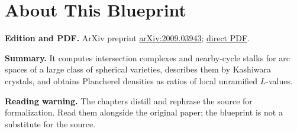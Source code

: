 

\chapter*{About This Blueprint}
\label{intersection-complexes-unramified-l-factors-about}


\textbf{Edition and PDF.} ArXiv preprint \href{https://arxiv.org/abs/2009.03943}{arXiv:2009.03943}; \href{https://arxiv.org/pdf/2009.03943}{direct PDF}.

\textbf{Summary.} It computes intersection complexes and nearby-cycle stalks for arc spaces of a large class of spherical varieties, describes them by Kashiwara crystals, and obtains Plancherel densities as ratios of local unramified $L$-values.

\textbf{Reading warning.} The chapters distill and rephrase the source for formalization. Read them alongside the original paper; the blueprint is not a substitute for the source.














